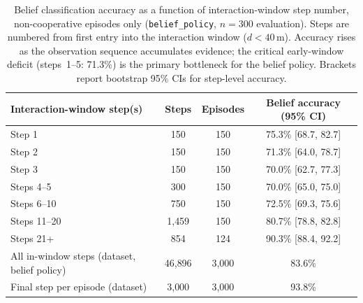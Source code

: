 \begin{table}[htbp]
\centering
\caption{Belief classification accuracy as a function of interaction-window step
  number, non-cooperative episodes only (\texttt{belief\_policy},
  $n{=}300$ evaluation).
  Steps are numbered from first entry into the interaction window ($d{<}40$\,m).
  Accuracy rises as the observation sequence accumulates evidence; the
  critical early-window deficit (steps~1--5: 71.3\%) is the primary
  bottleneck for the belief policy. Brackets report bootstrap 95\% CIs for
  step-level accuracy.}
\label{tab:where_when}
\small
\begin{tabular}{lccc}
\toprule
\textbf{Interaction-window step(s)} & \textbf{Steps} &
\textbf{Episodes} & \textbf{Belief accuracy (95\% CI)} \\
\midrule
Step 1  & 150 & 150 & 75.3\% [68.7, 82.7] \\
Step 2  & 150 & 150 & 71.3\% [64.0, 78.7] \\
Step 3  & 150 & 150 & 70.0\% [62.7, 77.3] \\
Steps 4--5 & 300 & 150 & 70.0\% [65.0, 75.0] \\
Steps 6--10 & 750 & 150 & 72.5\% [69.3, 75.6] \\
Steps 11--20 & 1{,}459 & 150 & 80.7\% [78.8, 82.8] \\
Steps 21+ & 854 & 124 & 90.3\% [88.4, 92.2] \\
\midrule
All in-window steps (dataset, belief policy) & 46{,}896 & 3{,}000 & 83.6\% \\
Final step per episode (dataset)              & 3{,}000 & 3{,}000 & 93.8\% \\
\bottomrule
\end{tabular}
\end{table}
